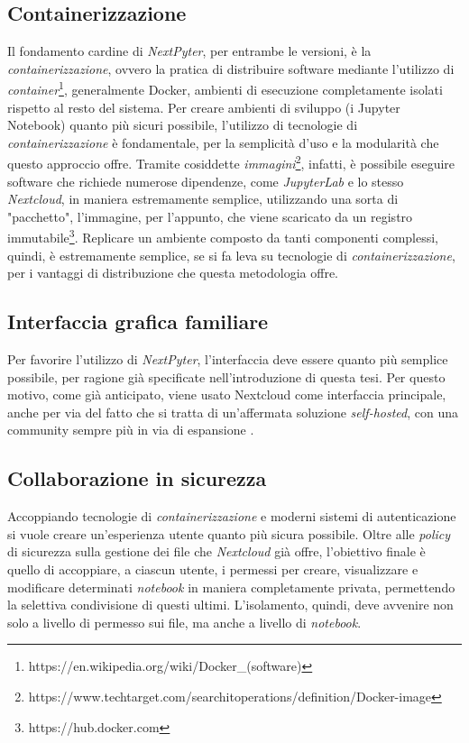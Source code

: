 \subsection{Containerizzazione}
Il fondamento cardine di \textit{NextPyter}, per entrambe le versioni, è la \textit{containerizzazione}, ovvero la pratica di distribuire software mediante l'utilizzo di \textit{container}\footnote{https://en.wikipedia.org/wiki/Docker\_(software)}, generalmente Docker, ambienti di esecuzione completamente isolati rispetto al resto del sistema. 
\newline
Per creare ambienti di sviluppo (i Jupyter Notebook) quanto più sicuri possibile, l'utilizzo di tecnologie di \textit{containerizzazione} è fondamentale, per la semplicità d'uso e la modularità che questo approccio offre.\newline
Tramite cosiddette \textit{immagini}\footnote{https://www.techtarget.com/searchitoperations/definition/Docker-image}, infatti, è possibile eseguire software che richiede numerose dipendenze, come \textit{JupyterLab} e lo stesso \textit{Nextcloud}, in maniera estremamente semplice, utilizzando una sorta di "pacchetto", l'immagine, per l'appunto, che viene scaricato da un registro immutabile\footnote{https://hub.docker.com}. Replicare un ambiente composto da tanti componenti complessi, quindi, è estremamente semplice, se si fa leva su tecnologie di \textit{containerizzazione}, per i vantaggi di distribuzione che questa metodologia offre.

\subsection{Interfaccia grafica familiare}
Per favorire l'utilizzo di \textit{NextPyter}, l'interfaccia deve essere quanto più semplice possibile, per ragione già specificate nell'introduzione di questa tesi. 
\newline
Per questo motivo, come già anticipato, viene usato Nextcloud come interfaccia principale, anche per via del fatto che si tratta di un'affermata soluzione \textit{self-hosted}, con una community sempre più in via di espansione \cite{nextcloud-growing}.

\subsection{Collaborazione in sicurezza}
Accoppiando tecnologie di \textit{containerizzazione} e moderni sistemi di autenticazione si vuole creare un'esperienza utente quanto più sicura possibile. \newline
Oltre alle \textit{policy} di sicurezza sulla gestione dei file che \textit{Nextcloud} già offre, l'obiettivo finale è quello di accoppiare, a ciascun utente, i permessi per creare, visualizzare e modificare determinati \textit{notebook} in maniera completamente privata, permettendo la selettiva condivisione di questi ultimi.
\newline
L'isolamento, quindi, deve avvenire non solo a livello di permesso sui file, ma anche a livello di \textit{notebook}.

